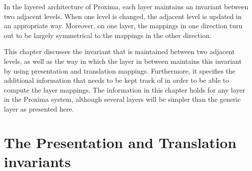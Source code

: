 


In the layered architecture of Proxima, each layer maintains an invariant between two adjacent levels. When one level is changed, the adjacent level is updated in an appropriate way. Moreover, on one layer, the mappings in one direction turn out to be largely symmetrical to the mappings in the other direction.

This chapter discusses the invariant that is maintained between two adjacent levels, as well as the way in which the layer in between maintains this invariant by using presentation and translation mappings. Furthermore, it specifies the additional information that needs to be kept track of in order to be able to compute the layer mappings. The information in this chapter holds for any layer in the Proxima system, although several layers will be simpler than the generic layer as presented here.





%									
%									
%									
\section{The Presentation and Translation invariants}



